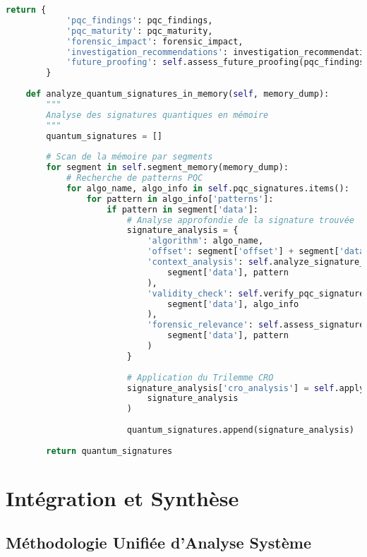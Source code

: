 \begin{lstlisting}[language=Python, caption=Détecteur de cryptographie quantique dans les systèmes]
        return {
            'pqc_findings': pqc_findings,
            'pqc_maturity': pqc_maturity,
            'forensic_impact': forensic_impact,
            'investigation_recommendations': investigation_recommendations,
            'future_proofing': self.assess_future_proofing(pqc_findings)
        }
    
    def analyze_quantum_signatures_in_memory(self, memory_dump):
        """
        Analyse des signatures quantiques en mémoire
        """
        quantum_signatures = []
        
        # Scan de la mémoire par segments
        for segment in self.segment_memory(memory_dump):
            # Recherche de patterns PQC
            for algo_name, algo_info in self.pqc_signatures.items():
                for pattern in algo_info['patterns']:
                    if pattern in segment['data']:
                        # Analyse approfondie de la signature trouvée
                        signature_analysis = {
                            'algorithm': algo_name,
                            'offset': segment['offset'] + segment['data'].find(pattern),
                            'context_analysis': self.analyze_signature_context(
                                segment['data'], pattern
                            ),
                            'validity_check': self.verify_pqc_signature_validity(
                                segment['data'], algo_info
                            ),
                            'forensic_relevance': self.assess_signature_relevance(
                                segment['data'], pattern
                            )
                        }
                        
                        # Application du Trilemme CRO
                        signature_analysis['cro_analysis'] = self.apply_cro_to_signature(
                            signature_analysis
                        )
                        
                        quantum_signatures.append(signature_analysis)
                        
        return quantum_signatures
\end{lstlisting}

\section{Intégration et Synthèse}

\subsection{Méthodologie Unifiée d'Analyse Système}

